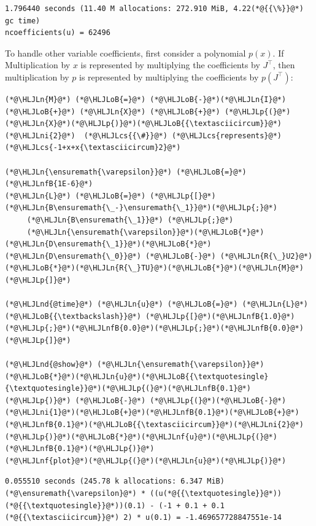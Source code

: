 \documentclass[12pt,a4paper]{article}
\newcommand{\HLJLn}[1]{#1}
\newcommand{\HLJLnd}[1]{\textcolor[RGB]{214,102,97}{#1}}
\newcommand{\HLJLnf}[1]{\textcolor[RGB]{66,102,213}{#1}}
\newcommand{\HLJLnfB}[1]{\textcolor[RGB]{59,151,46}{#1}}
\newcommand{\HLJLni}[1]{\textcolor[RGB]{59,151,46}{#1}}
\newcommand{\HLJLoB}[1]{\textcolor[RGB]{102,102,102}{\textbf{#1}}}
\newcommand{\HLJLp}[1]{#1}
\newcommand{\HLJLcs}[1]{\textcolor[RGB]{153,153,119}{\textit{#1}}}
\begin{document}
\begin{lstlisting}
1.796440 seconds (11.40 M allocations: 272.910 MiB, 4.22(*@{{\%}}@*) gc time)
ncoefficients(u) = 62496
\end{lstlisting}


To handle other variable coefficients, first consider a polynomial $p(x)$. If Multiplication by $x$ is represented by multiplying the coefficients by $J^\top$, then multiplication by $p$ is represented by multiplying the coefficients by $p(J^\top)$:


\begin{lstlisting}
(*@\HLJLn{M}@*) (*@\HLJLoB{=}@*) (*@\HLJLoB{-}@*)(*@\HLJLn{I}@*) (*@\HLJLoB{+}@*) (*@\HLJLn{X}@*) (*@\HLJLoB{+}@*) (*@\HLJLp{(}@*)(*@\HLJLn{X}@*)(*@\HLJLp{)}@*)(*@\HLJLoB{{\textasciicircum}}@*)(*@\HLJLni{2}@*)  (*@\HLJLcs{{\#}}@*) (*@\HLJLcs{represents}@*) (*@\HLJLcs{-1+x+x{\textasciicircum}2}@*)

(*@\HLJLn{\ensuremath{\varepsilon}}@*) (*@\HLJLoB{=}@*) (*@\HLJLnfB{1E-6}@*)
(*@\HLJLn{L}@*) (*@\HLJLoB{=}@*) (*@\HLJLp{[}@*)(*@\HLJLn{B\ensuremath{\_-}\ensuremath{\_1}}@*)(*@\HLJLp{;}@*)
     (*@\HLJLn{B\ensuremath{\_1}}@*) (*@\HLJLp{;}@*)
     (*@\HLJLn{\ensuremath{\varepsilon}}@*)(*@\HLJLoB{*}@*)(*@\HLJLn{D\ensuremath{\_1}}@*)(*@\HLJLoB{*}@*)(*@\HLJLn{D\ensuremath{\_0}}@*) (*@\HLJLoB{-}@*) (*@\HLJLn{R{\_}U2}@*)(*@\HLJLoB{*}@*)(*@\HLJLn{R{\_}TU}@*)(*@\HLJLoB{*}@*)(*@\HLJLn{M}@*)(*@\HLJLp{]}@*)

(*@\HLJLnd{@time}@*) (*@\HLJLn{u}@*) (*@\HLJLoB{=}@*) (*@\HLJLn{L}@*) (*@\HLJLoB{{\textbackslash}}@*) (*@\HLJLp{[}@*)(*@\HLJLnfB{1.0}@*)(*@\HLJLp{;}@*)(*@\HLJLnfB{0.0}@*)(*@\HLJLp{;}@*)(*@\HLJLnfB{0.0}@*)(*@\HLJLp{]}@*)

(*@\HLJLnd{@show}@*) (*@\HLJLn{\ensuremath{\varepsilon}}@*)(*@\HLJLoB{*}@*)(*@\HLJLn{u}@*)(*@\HLJLoB{{\textquotesingle}{\textquotesingle}}@*)(*@\HLJLp{(}@*)(*@\HLJLnfB{0.1}@*)(*@\HLJLp{)}@*) (*@\HLJLoB{-}@*) (*@\HLJLp{(}@*)(*@\HLJLoB{-}@*)(*@\HLJLni{1}@*)(*@\HLJLoB{+}@*)(*@\HLJLnfB{0.1}@*)(*@\HLJLoB{+}@*)(*@\HLJLnfB{0.1}@*)(*@\HLJLoB{{\textasciicircum}}@*)(*@\HLJLni{2}@*)(*@\HLJLp{)}@*)(*@\HLJLoB{*}@*)(*@\HLJLnf{u}@*)(*@\HLJLp{(}@*)(*@\HLJLnfB{0.1}@*)(*@\HLJLp{)}@*)
(*@\HLJLnf{plot}@*)(*@\HLJLp{(}@*)(*@\HLJLn{u}@*)(*@\HLJLp{)}@*)
\end{lstlisting}

\begin{lstlisting}
0.055510 seconds (245.78 k allocations: 6.347 MiB)
(*@\ensuremath{\varepsilon}@*) * ((u(*@{{\textquotesingle}}@*))(*@{{\textquotesingle}}@*))(0.1) - (-1 + 0.1 + 0.1 (*@{{\textasciicircum}}@*) 2) * u(0.1) = -1.469657728847551e-14
\end{lstlisting}
\end{document}
